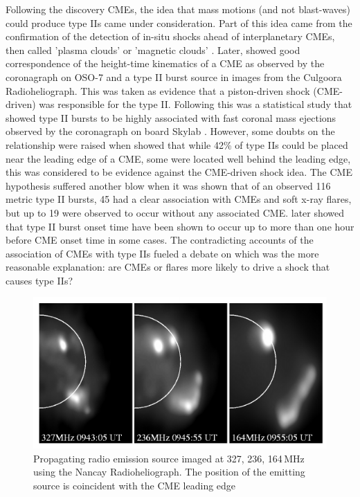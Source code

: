 Following the discovery CMEs, the idea that mass motions (and not blast-waves) could produce type IIs came under consideration. Part of this idea came from the confirmation of the detection of in-situ shocks ahead of interplanetary CMEs, then called 'plasma clouds' or 'magnetic clouds' \citep{hundhausen1972}. Later, \citep{stewart1974} showed good correspondence of the height-time kinematics of a CME as observed by the coronagraph on OSO-7 and a type II burst source in images from the Culgoora Radioheliograph. This was taken as evidence that a piston-driven shock (CME-driven) was responsible for the type II. Following this was a statistical study that showed type II bursts to be highly associated with fast coronal mass ejections observed by the coronagraph on board Skylab \citep{gosling1976}. However, some doubts on the relationship were raised when \citep{robinson1985} showed that while 42\% of type IIs could be placed near the leading edge of a CME, some were located well behind the leading edge, this was considered to be evidence against the CME-driven shock idea. The CME hypothesis suffered another blow when
it was shown that of an observed 116 metric type II bursts, 45 had a clear association with CMEs and soft x-ray flares, but up to 19 were observed to occur without any associated CME. \citep{classen2002} later showed that type II burst onset time have been shown to occur up to more than one hour before CME onset time in some cases. The contradicting accounts of the association of CMEs with type IIs fueled a debate on which was the more reasonable explanation: are CMEs or flares more likely to drive a shock that causes type IIs?  
\begin{figure}
\begin{center}
\includegraphics[scale=1.1, trim=0cm 0cm 0cm 0.5cm]{images/radio_shock.pdf}
\caption[Low frequency image of a radio shock]{Propagating radio emission source imaged at 327, 236, 164\,MHz using the Nancay Radioheliograph. The position of the emitting source is coincident with the CME leading edge \citep{maia2000}}
\end{center}
\label{fig:maia}
\end{figure}
